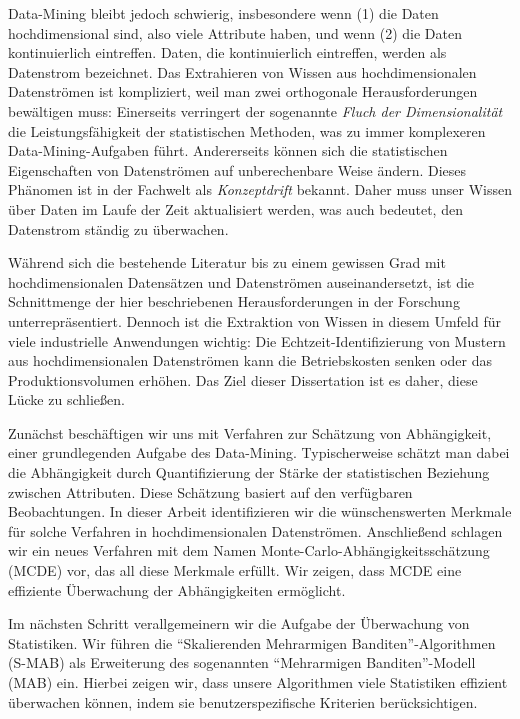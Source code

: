 \documentclass[smalldiss]{sdqdiss-a4}
\begin{document}
Data-Mining bleibt jedoch schwierig, insbesondere wenn (1) die Daten hochdimensional sind, also viele Attribute haben, und wenn (2) die Daten kontinuierlich eintreffen. Daten, die kontinuierlich eintreffen, werden als Datenstrom bezeichnet. Das Extrahieren von Wissen aus hochdimensionalen Datenströmen ist kompliziert, weil man zwei orthogonale Herausforderungen bewältigen muss: Einerseits verringert der sogenannte \textit{Fluch der Dimensionalität} die Leistungsfähigkeit der statistischen Methoden, was zu immer komplexeren Data-Mining-Aufgaben führt. Andererseits können sich die statistischen Eigenschaften von Datenströmen auf unberechenbare Weise ändern. Dieses Phänomen ist in der Fachwelt als \textit{Konzeptdrift} bekannt. Daher muss unser Wissen über Daten im Laufe der Zeit aktualisiert werden, was auch bedeutet, den Datenstrom ständig zu überwachen.

Während sich die bestehende Literatur bis zu einem gewissen Grad mit hochdimensionalen Datensätzen und Datenströmen auseinandersetzt, ist die Schnittmenge der hier beschriebenen Herausforderungen in der Forschung unterrepräsentiert. Dennoch ist die Extraktion von Wissen in diesem Umfeld für viele industrielle Anwendungen wichtig: Die Echtzeit-Identifizierung von Mustern aus hochdimensionalen Datenströmen kann die Betriebskosten senken oder das Produktionsvolumen erhöhen. Das Ziel dieser Dissertation ist es daher, diese Lücke zu schließen.

Zunächst beschäftigen wir uns mit Verfahren zur Schätzung von Abhängigkeit, einer grundlegenden Aufgabe des Data-Mining. Typischerweise schätzt man dabei die Abhängigkeit durch Quantifizierung der Stärke der statistischen Beziehung zwischen Attributen.
Diese Schätzung basiert auf den verfügbaren Beobachtungen. In dieser Arbeit identifizieren wir die wünschenswerten Merkmale für solche Verfahren in hochdimensionalen Datenströmen. Anschließend schlagen wir ein neues Verfahren mit dem Namen Monte-Carlo-Abhängigkeitsschätzung (\gls{MCDE}) vor, das all diese Merkmale erfüllt. Wir zeigen, dass \gls{MCDE} eine effiziente Überwachung der Abhängigkeiten ermöglicht.

Im nächsten Schritt verallgemeinern wir die Aufgabe der Überwachung von Statistiken. Wir führen die ``Skalierenden Mehrarmigen Banditen''-Algorithmen (\gls{S-MAB}) als Erweiterung des sogenannten ``Mehrarmigen Banditen''-Modell (\gls{MAB}) ein. Hierbei zeigen wir, dass unsere Algorithmen viele Statistiken effizient überwachen können, indem sie benutzerspezifische Kriterien berücksichtigen.
\end{document}

